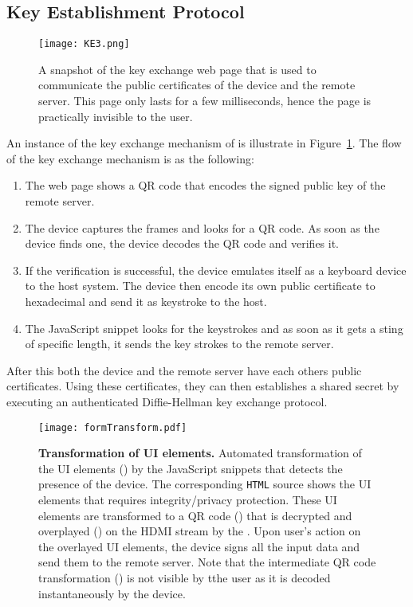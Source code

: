 \subsection{Key Establishment Protocol}


\begin{figure}[t]
\centering
\texttt{[image: KE3.png]}
\caption{A snapshot of the key exchange web page that is used to communicate the public certificates of the device and the remote server. This page only lasts for a few milliseconds, hence the page is practically invisible to the user.}
\label{fig:keyExchange}
\centering
\end{figure}


An instance of the key exchange mechanism of \name is illustrate in Figure~\ref{fig:keyExchange}. The flow of the key exchange mechanism is as the following:

\begin{enumerate}
  \item The web page shows a QR code that encodes the signed public key of the remote server. 
  \item The device captures the frames and looks for a QR code. As soon as the device finds one, the device decodes the QR code and verifies it.
  \item If the verification is successful, the device emulates itself as a keyboard device to the host system. The device then encode its own public certificate to hexadecimal and send it as keystroke to the host.
  \item The JavaScript snippet looks for the keystrokes and as soon as it gets a sting of specific length, it sends the key strokes to the remote server.  
\end{enumerate}

After this both the device and the remote server have each others public certificates. Using these certificates, they can then establishes a shared secret by executing an authenticated Diffie-Hellman key exchange protocol.



\begin{figure*}[t]
\centering
\texttt{[image: formTransform.pdf]}
\caption{\textbf{Transformation of UI elements.} Automated transformation of the UI elements (\one) by the \name JavaScript snippets that detects the presence of the device. The corresponding \texttt{HTML} source shows the UI elements that requires integrity/privacy protection. These UI elements are transformed to a QR code (\two) that is decrypted and overplayed (\three) on the HDMI stream by the \device. Upon user's action on the overlayed UI elements, the device signs all the input data and send them to the remote server. Note that the intermediate QR code transformation (\two) is not visible by tthe user as it is decoded instantaneously by the device.}
\label{fig:transformation}
\end{figure*}

